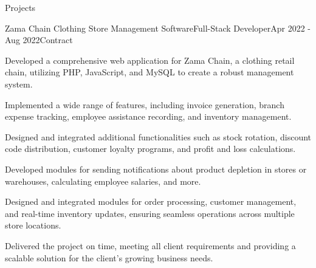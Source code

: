 \documentclass[]{kyvernitis-resume}
\begin{document}
\begin{section}{Projects}
\begin{subsection}{Zama Chain Clothing Store Management Software}{Full-Stack Developer}{Apr 2022 - Aug 2022}{Contract}{}
		\item Developed a comprehensive web application for Zama Chain, a clothing retail chain, utilizing PHP, JavaScript, and MySQL to create a robust management system.
		\item Implemented a wide range of features, including invoice generation, branch expense tracking, employee assistance recording, and inventory management.
		\item Designed and integrated additional functionalities such as stock rotation, discount code distribution, customer loyalty programs, and profit and loss calculations.
		\item Developed modules for sending notifications about product depletion in stores or warehouses, calculating employee salaries, and more.

		\item Designed and integrated modules for order processing, customer management, and real-time inventory updates, ensuring seamless operations across multiple store locations.
		\item Delivered the project on time, meeting all client requirements and providing a scalable solution for the client's growing business needs.

    \end{subsection}


\end{section}
\end{document}
